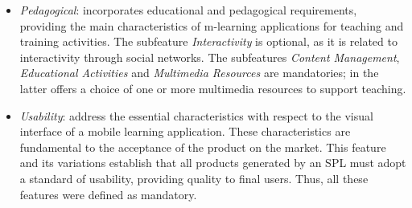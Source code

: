 \begin{itemize}

    \item \textit{Pedagogical}: incorporates educational and pedagogical requirements, providing the main characteristics of m-learning applications for teaching and training activities. The subfeature \textit{Interactivity} is optional, as it is related to interactivity through social networks. The subfeatures \textit{Content Management}, \textit{Educational Activities} and \textit{Multimedia Resources} are mandatories; in the latter offers a choice of one or more multimedia resources to support teaching.
    
    \item \textit{Usability}: address the essential characteristics with respect to the visual interface of a mobile learning application. These characteristics are fundamental to the acceptance of the product on the market. This feature and its variations establish that all products generated by an SPL must adopt a standard of usability, providing quality to final users. Thus, all these features were defined as mandatory.



\end{itemize}
